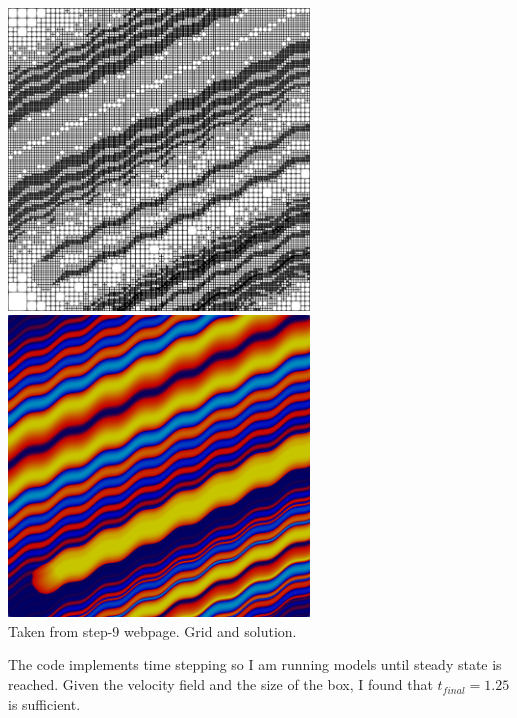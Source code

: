 \begin{center}
\includegraphics[width=8cm]{python_codes/fieldstone_43/images/step-9-grid-9.png}
\includegraphics[width=8cm]{python_codes/fieldstone_43/images/step-9-solution-9.png}\\
{\captionfont Taken from step-9 webpage. Grid and solution.}
\end{center}

The code implements time stepping so I am running models until steady state is reached. 
Given the velocity field and the size of the box, I found that $t_{final}=1.25$ is sufficient.


